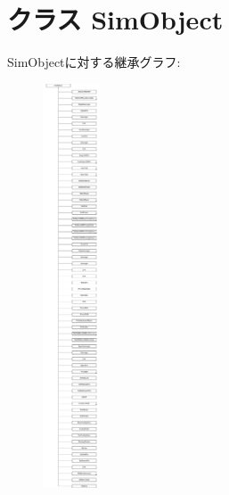 \hypertarget{classm5_1_1SimObject_1_1SimObject}{
\section{クラス SimObject}
\label{classm5_1_1SimObject_1_1SimObject}
}
SimObjectに対する継承グラフ:\begin{figure}[H]
\begin{center}
\leavevmode
\includegraphics[height=12cm]{classm5_1_1SimObject_1_1SimObject}
\end{center}
\end{figure}
